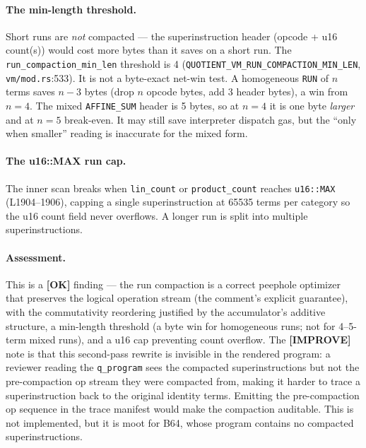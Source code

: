 \paragraph{The min-length threshold.}
Short runs are \emph{not} compacted --- the superinstruction
header (opcode + u16 count(s)) would cost more bytes than it
saves on a short run. The \texttt{run\_\allowbreak{}compaction\_\allowbreak{}min\_\allowbreak{}len}
threshold is 4 (\texttt{QUOTIENT\_\allowbreak{}VM\_\allowbreak{}RUN\_\allowbreak{}COMPACTION\_\allowbreak{}MIN\_\allowbreak{}LEN},
\texttt{vm/mod.rs}:533).  It is not a byte-exact
net-win test. A homogeneous \texttt{RUN} of $n$ terms saves $n-3$
bytes (drop $n$ opcode bytes, add 3 header bytes), a win from
$n{=}4$. The mixed \texttt{AFFINE\_SUM} header is 5 bytes, so at
$n{=}4$ it is one byte \emph{larger} and at $n{=}5$ break-even. It
may still save interpreter dispatch gas, but the ``only when
smaller'' reading is inaccurate for the mixed form.

\paragraph{The u16::MAX run cap.}
The inner scan breaks when \texttt{lin\_count} or
\texttt{product\_count} reaches \texttt{u16::MAX} (L1904--1906),
capping a single superinstruction at 65535 terms per category so
the u16 count field never overflows. A longer run is split into
multiple superinstructions.

\paragraph{Assessment.} This is a
\textcolor{tracegreen}{\textbf{[OK]}} finding --- the run
compaction is a correct peephole optimizer that preserves the
logical operation stream (the comment's explicit guarantee), with
the commutativity reordering justified by the accumulator's
additive structure, a min-length threshold (a byte win for
homogeneous runs; not for 4--5-term mixed runs), and a u16 cap
preventing count overflow. The
\textcolor{codegenblue}{\textbf{[IMPROVE]}} note is that this
second-pass rewrite is invisible in the rendered program: a
reviewer reading the \texttt{q\_program} sees the compacted
superinstructions but not the pre-compaction op stream they were
compacted from, making it harder to trace a superinstruction back
to the original identity terms. Emitting the pre-compaction op
sequence in the trace manifest would make the compaction
auditable.  This is not implemented, but it is moot
for B64, whose program contains no compacted superinstructions.

